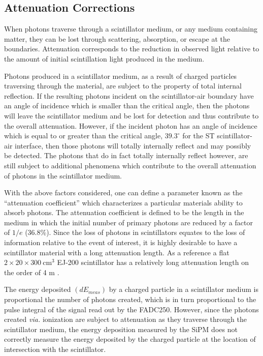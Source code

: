 \subsection{Attenuation Corrections} \label{sec:calib_ac}

When photons traverse through a scintillator medium, or any medium containing matter, they can be lost through scattering, absorption, or escape at the boundaries.  Attenuation corresponds to the reduction in observed light relative to the amount of initial scintillation light produced in the medium.

Photons produced in a scintillator medium, as a result of charged particles traversing through the material,  are subject to the property of total internal reflection.  If the resulting photons incident on the scintillator-air boundary have an angle of incidence which is smaller than the critical angle, then the photons will leave the scintillator medium and be lost for detection and thus contribute to the overall attenuation.  However, if the incident  photon has an angle of incidence which is equal to or greater than the critical angle, $39.3^{\circ}$ for the ST scintillator-air interface, then those photons will totally internally reflect and may possibly be detected.  The photons that do in fact totally internally reflect however, are still subject to additional phenomena which contribute to the overall attenuation of photons in the scintillator medium.  

With the above factors considered, one can define a parameter known as the ``attenuation coefficient'' which characterizes a particular materials ability to absorb photons. The attenuation coefficient is defined to be the length in the medium in which the initial number of primary  photons are reduced by a factor of $1/e$ (36.8\%).  Since the loss of photons in scintillators equates to the loss of information relative to the event of interest, it is highly desirable to have a scintillator material with a long attenuation length.  As a reference a flat $2 \times 20 \times 300\ \mathrm{cm^{3}}$ EJ-200 scintillator has a relatively long attenuation length on the order of 4 m \cite{ej200_specs}.

The energy deposited $(dE_{meas})$ by a charged particle in a scintillator medium is proportional the number of photons created, which is in turn proportional to the pulse integral of the signal read out by the FADC250.  However, since the photons created \textit{via.} ionization are subject to attenuation as they traverse through the scintillator medium, the energy deposition measured by the SiPM does not correctly measure the energy deposited by the charged particle at the location of intersection with the scintillator.  

